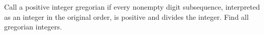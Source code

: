 Call a positive integer gregorian if every nonempty digit subsequence, interpreted as an integer in the original order, is positive and divides the integer. Find all gregorian integers.
